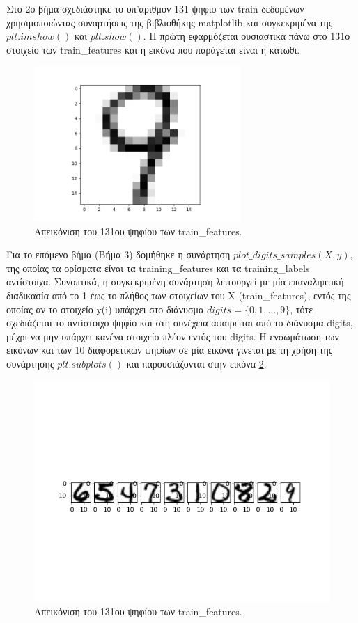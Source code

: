 \documentclass[11pt]{article} %
\begin{document}
Στο 2ο βήμα σχεδιάστηκε το υπ'αριθμόν 131 ψηφίο των train δεδομένων χρησιμοποιώντας συναρτήσεις της βιβλιοθήκης matplotlib και συγκεκριμένα της $plt.imshow()$ και $plt.show()$. Η πρώτη εφαρμόζεται ουσιαστικά πάνω στο 131ο στοιχείο των train\_features και η εικόνα που παράγεται είναι η κάτωθι.

\begin{figure}[H]
    \centering
    \includegraphics[width=0.7\textwidth]{plots/Step 2}
    \caption{Απεικόνιση του 131ου ψηφίου των train\_features.}
    \label{fig:step_2}
\end{figure}

Για το επόμενο βήμα (Βήμα 3) δομήθηκε η συνάρτηση $plot\_digits\_samples(X, y)$, της οποίας τα ορίσματα είναι τα training\_features και τα training\_labels αντίστοιχα. Συνοπτικά, η συγκεκριμένη συνάρτηση λειτουργεί με μία επαναληπτική διαδικασία από το 1 έως το πλήθος των στοιχείων του X (train\_features), εντός της οποίας αν το στοιχείο y(i) υπάρχει στο διάνυσμα $digits = \{0,1,...,9\}$, τότε σχεδιάζεται το αντίστοιχο ψηφίο και στη συνέχεια αφαιρείται από το διάνυσμα digits, μέχρι να μην υπάρχει κανένα στοιχείο πλέον εντός του digits. Η ενσωμάτωση των εικόνων και των 10 διαφορετικών ψηφίων σε μία εικόνα γίνεται με τη χρήση της συνάρτησης $plt.subplots()$ και παρουσιάζονται στην εικόνα \ref{fig:step_3}.

\begin{figure}[H]
    \centering
    \includegraphics[width=1.1\textwidth]{plots/Step 3}
    \caption{Απεικόνιση του 131ου ψηφίου των train\_features.}
    \label{fig:step_3}
\end{figure}
\end{document}
